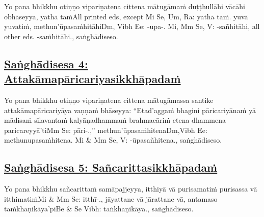 Yo pana bhikkhu otiṇṇo vipariṇatena cittena mātugāmaṁ duṭṭhullāhi vācāhi obhāseyya, yathā taṁ\makeatletter\hyperlink{endnote-appendix}\makeatother All printed eds, except Mi Se, Um, Ra: yathā taṁ. yuvā yuvatiṁ, methun'ūpasaṁhitāhi\makeatletter\hyperlink{endnote-appendix}\makeatother Dm, Vibh Ee: -upa-. Mi, Mm Se, V: -sañhitāhi, all other eds. -saṁhitāhi., saṅghādiseso.



\subsection*{\hyperref[comm4]{Saṅghādisesa 4: Attakāmapāricariyasikkhāpadaṁ}}
\label{sd4}

Yo pana bhikkhu otiṇṇo vipariṇatena cittena mātugāmassa santike attakāmapāricariyāya vaṇṇaṁ bhāseyya: ``Etad'aggaṁ bhagini pāricariyānaṁ yā mādisaṁ sīlavantaṁ kalyāṇadhammaṁ brahmacāriṁ etena dhammena paricareyyā'ti\makeatletter\hyperlink{endnote-appendix}\makeatother Mm Se: pāri-.,'' methun'ūpasaṁhitena\makeatletter\hyperlink{endnote-appendix}\makeatother Dm,Vibh Ee: methunupasaṁhitena. Mi & Mm Se, V: -ūpasañhitena., saṅghādiseso.



\subsection*{\hyperref[comm5]{Saṅghādisesa 5: Sañcarittasikkhāpadaṁ}}
\label{sd5}

Yo pana bhikkhu sañcarittaṁ samāpajjeyya, itthiyā vā purisamatiṁ purisassa vā itthimatiṁ\makeatletter\hyperlink{endnote-appendix}\makeatother Mi & Mm Se: itthī-., jāyattane vā jārattane vā, antamaso taṁkhaṇikāya'pi\makeatletter\hyperlink{endnote-appendix}\makeatother Be & Se Vibh: taṅkhaṇikāya., saṅghādiseso.




